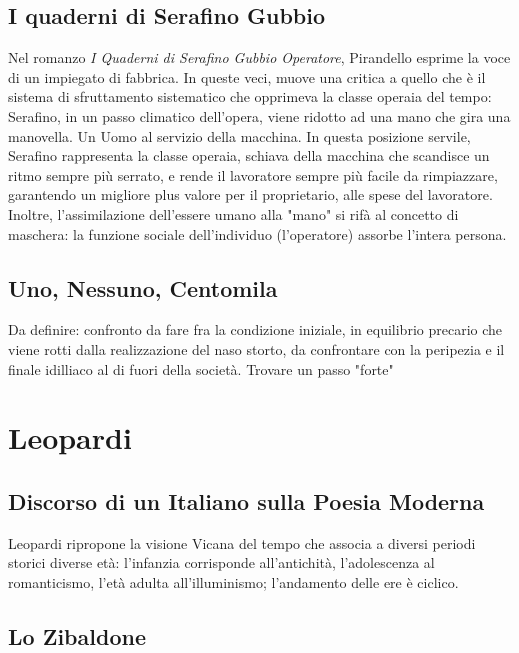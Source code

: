 \documentclass{article}
\begin{document}
\subsection{I quaderni di Serafino Gubbio} %
\label{sub:I quaderni di Serafino Gubbio}
Nel romanzo \textit{I Quaderni di Serafino Gubbio Operatore}\cite{quaderni_serafino}, Pirandello esprime la voce di un impiegato di fabbrica. In queste veci, muove una critica a quello che è il sistema di sfruttamento sistematico che opprimeva la classe operaia del tempo: Serafino, in un passo climatico dell'opera, viene ridotto ad una mano che gira una manovella. Un Uomo al servizio della macchina. In questa posizione servile, Serafino rappresenta la classe operaia, schiava della macchina che scandisce un ritmo sempre più serrato, e rende il lavoratore sempre più facile da rimpiazzare, garantendo un migliore plus valore per il proprietario, alle spese del lavoratore. Inoltre, l'assimilazione dell'essere umano alla "mano" si rifà al concetto di maschera: la funzione sociale dell'individuo (l'operatore) assorbe l'intera persona.

\subsection{Uno, Nessuno, Centomila} %
\label{sub:Uno Nessuno Centomila}
Da definire: confronto da fare fra la condizione iniziale, in equilibrio precario che viene rotti dalla realizzazione del
naso storto, da confrontare con la peripezia e il finale idilliaco al di fuori della società. Trovare un passo "forte"


\section{Leopardi} %
\label{sec:Leopardi}
\subsection{Discorso di un Italiano sulla Poesia Moderna} %
Leopardi ripropone la visione Vicana del tempo che associa a diversi periodi storici diverse età: l'infanzia corrisponde
all'antichità, l'adolescenza al romanticismo, l'età adulta all'illuminismo; l'andamento delle ere è ciclico. 
\label{sub:Discorso di un Italiano sulla Poesia Moderna}
\subsection{Lo Zibaldone} %
\label{sub:Lo Zibaldone}
\end{document}
